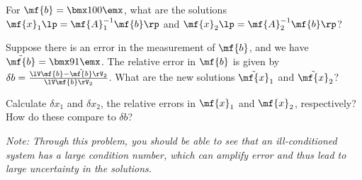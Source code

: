 \begin{enumerate}[resume]
\begin{enumerate}
        For $\mf{b} = \bmx 10 \\ 0\emx$, what are the solutions $\mf{x}_1\lp=\mf{A}_1^{-1}\mf{b}\rp$ and $\mf{x}_2\lp=\mf{A}_2^{-1}\mf{b}\rp$? 

        Suppose there is an error in the measurement of $\mf{b}$, and we have $\tilde{\mf{b}} = \bmx 9 \\ 1\emx$. The relative error in $\mf{b}$ is given by $\delta b = \frac{\lV \mf{b} - \tilde{\mf{b}}\rV_2}{\lV\mf{b}\rV_2}$. What are the new solutions $\tilde{\mf{x}}_1$ and $\tilde{\mf{x}}_2$?

        Calculate $\delta x_1$ and $\delta x_2$, the relative errors in $\mf{x}_1$ and $\mf{x}_2$, respectively? How do these compare to $\delta b$?

        \textit{Note: Through this problem, you should be able to see that an ill-conditioned system has a large condition number, which can amplify error and thus lead to large uncertainty in the solutions.}
    \end{enumerate}


\end{enumerate}
